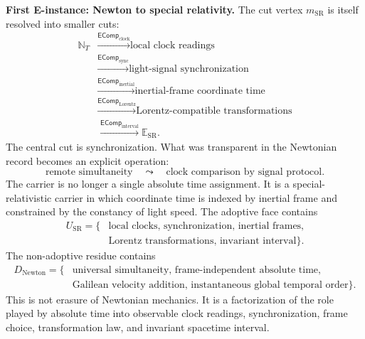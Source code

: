 \documentclass[11pt]{article}
\newcommand{\EComp}{\mathsf{EComp}}
\theoremstyle{definition}
\theoremstyle{plain}
\begin{document}
\textbf{First E-instance: Newton to special relativity.}  The cut vertex
$m_{\mathrm{SR}}$ is itself resolved into smaller cuts:
\[
\begin{aligned}
  \mathbb N_T
  &\xrightarrow{\EComp_{\mathrm{clock}}}
  \text{local clock readings}\\
  &\xrightarrow{\EComp_{\mathrm{sync}}}
  \text{light-signal synchronization}\\
  &\xrightarrow{\EComp_{\mathrm{inertial}}}
  \text{inertial-frame coordinate time}\\
  &\xrightarrow{\EComp_{\mathrm{Lorentz}}}
  \text{Lorentz-compatible transformations}\\
  &\xrightarrow{\EComp_{\mathrm{interval}}}
  \mathbb E_{\mathrm{SR}}.
\end{aligned}
\]
The central cut is synchronization.  What was transparent in the
Newtonian record becomes an explicit operation:
\[
  \text{remote simultaneity}
  \quad\leadsto\quad
  \text{clock comparison by signal protocol}.
\]
The carrier is no longer a single absolute time assignment.  It is a
special-relativistic carrier in which coordinate time is indexed by
inertial frame and constrained by the constancy of light speed.  The
adoptive face contains
\[
\begin{aligned}
  U_{\mathrm{SR}}
  =
  \{&\text{local clocks, synchronization, inertial frames,}\\
    &\text{Lorentz transformations, invariant interval}\}.
\end{aligned}
\]
The non-adoptive residue contains
\[
\begin{aligned}
  D_{\mathrm{Newton}}
  =
  \{&\text{universal simultaneity, frame-independent absolute time,}\\
    &\text{Galilean velocity addition, instantaneous global temporal order}\}.
\end{aligned}
\]
This is not erasure of Newtonian mechanics.  It is a factorization of the
role played by absolute time into observable clock readings, synchronization,
frame choice, transformation law, and invariant spacetime interval.
\end{document}
